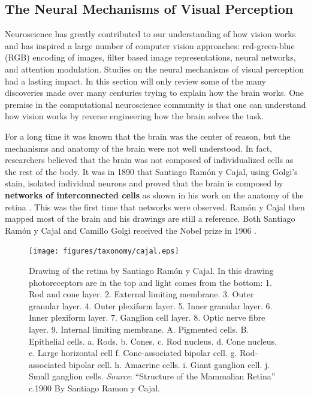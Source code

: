 

\subsection{The Neural Mechanisms of Visual Perception}

Neuroscience has greatly contributed to our understanding of how vision works and has inspired a large number of computer vision approaches: red-green-blue (RGB) encoding of images, filter based image representations, neural networks, and attention modulation. Studies on the neural mechanisms of visual perception had a lasting impact. In this section will only review some of the many discoveries made over many centuries trying to explain how the brain works. One premise in the computational neuroscience community is that one can understand how vision works by reverse engineering how the brain solves the task.

For a long time it was known that the brain was the center of reason, but the mechanisms and anatomy of the brain were not well understood. In fact, researchers believed that the brain was not composed of individualized cells as the rest of the body.
It was in 1890 that Santiago Ram\'{o}n y Cajal, using Golgi's stain,
isolated individual neurons and proved that the brain is composed by {\bf networks of interconnected cells} as shown in his work on the anatomy of the retina \cite{cajal1893retine}. This was the first time that networks were observed. Ram\'{o}n y Cajal then mapped most of the brain and his drawings are still a reference. Both Santiago Ram\'{o}n y Cajal and Camillo Golgi received the Nobel prize in 1906 \cite{Glickstein2006}.


\begin{figure}
    \centerline{
        \texttt{[image: figures/taxonomy/cajal.eps]}
    }
    \caption{Drawing of the retina by Santiago Ram\'{o}n y Cajal. In this drawing photoreceptors are in the top and light comes from the bottom:
    1. Rod and cone layer. 2. External limiting membrane. 3. Outer granular layer. 4. Outer plexiform layer. 5. Inner granular layer. 6. Inner plexiform layer. 7. Ganglion cell layer. 8. Optic nerve fibre layer. 9. Internal limiting membrane. A. Pigmented cells. B. Epithelial cells. a. Rods. b. Cones. c. Rod nucleus. d. Cone nucleus. e. Large horizontal cell f. Cone-associated bipolar cell. g. Rod-associated bipolar cell. h. Amacrine cells. i. Giant ganglion cell. j. Small ganglion cells.
        {\em Source}: ``Structure of the Mammalian Retina'' c.1900 By Santiago Ramon y Cajal.}
    \label{fig:cajal}
\end{figure}


